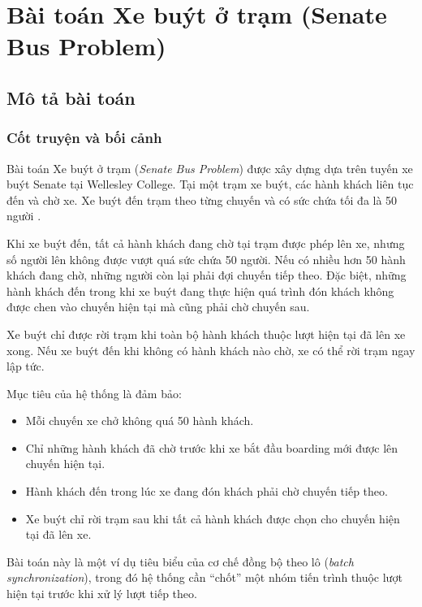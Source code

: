 \newpage
\section{Bài toán Xe buýt ở trạm (Senate Bus Problem)}

\subsection{Mô tả bài toán}

\subsubsection*{Cốt truyện và bối cảnh}

Bài toán Xe buýt ở trạm (\textit{Senate Bus Problem}) được xây dựng
dựa trên tuyến xe buýt Senate tại Wellesley College. Tại một trạm xe
buýt, các hành khách liên tục đến và chờ xe. Xe buýt đến trạm theo từng
chuyến và có sức chứa tối đa là 50 người
\cite[Sec.~7.4, p.~211]{downey2016}.

Khi xe buýt đến, tất cả hành khách đang chờ tại trạm được phép lên xe,
nhưng số người lên không được vượt quá sức chứa 50 người. Nếu có nhiều
hơn 50 hành khách đang chờ, những người còn lại phải đợi chuyến tiếp
theo. Đặc biệt, những hành khách đến trong khi xe buýt đang thực hiện
quá trình đón khách không được chen vào chuyến hiện tại mà cũng phải
chờ chuyến sau.

Xe buýt chỉ được rời trạm khi toàn bộ hành khách thuộc lượt hiện tại đã
lên xe xong. Nếu xe buýt đến khi không có hành khách nào chờ, xe có thể
rời trạm ngay lập tức.

Mục tiêu của hệ thống là đảm bảo:

\begin{itemize}
\item Mỗi chuyến xe chở không quá 50 hành khách.
\item Chỉ những hành khách đã chờ trước khi xe bắt đầu boarding mới
được lên chuyến hiện tại.
\item Hành khách đến trong lúc xe đang đón khách phải chờ chuyến
tiếp theo.
\item Xe buýt chỉ rời trạm sau khi tất cả hành khách được chọn cho
chuyến hiện tại đã lên xe.
\end{itemize}

Bài toán này là một ví dụ tiêu biểu của cơ chế đồng bộ theo lô
(\textit{batch synchronization}), trong đó hệ thống cần ``chốt'' một
nhóm tiến trình thuộc lượt hiện tại trước khi xử lý lượt tiếp theo.

